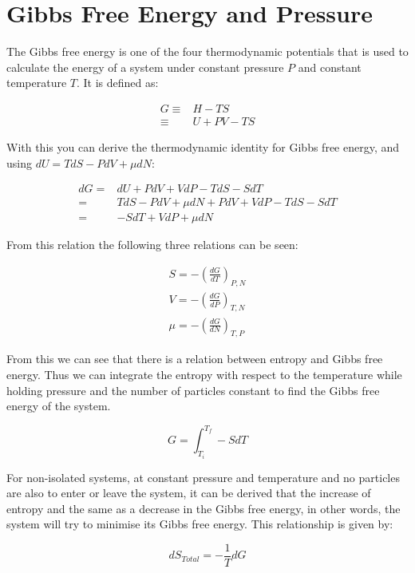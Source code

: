 \documentclass[../hand-in3.tex]{subfiles}
\begin{document}
\section{Gibbs Free Energy and Pressure}

The Gibbs free energy is one of the four thermodynamic potentials that is used to calculate the energy of a system under constant pressure $P$ and constant temperature $T$. It is defined as:

\begin{align}
G \equiv& H - TS \\
  \equiv& U +PV -TS 	
\end{align}

With this you can derive the thermodynamic identity for Gibbs free energy, and using $dU = TdS - PdV + \mu dN$:

\begin{align}
dG =& dU + PdV + VdP -TdS -SdT \\
   =& TdS - PdV + \mu dN + PdV + VdP -TdS -SdT \\ 
   =& -SdT + VdP + \mu dN
\end{align}

From this relation the following three relations can be seen:

\begin{align}
S = - \left( \frac{dG}{dT} \right)_{P,N} \\
V = - \left( \frac{dG}{dP} \right)_{T,N} \\
\mu = - \left( \frac{dG}{dN} \right)_{T,P} 
\end{align}

From this we can see that there is a relation between entropy and Gibbs free energy. Thus we can integrate the entropy with respect to the temperature while holding pressure and the number of particles constant to find the Gibbs free energy of the system.

\begin{equation}
G = \int_{T_i}^{T_f} -SdT
\end{equation}

For non-isolated systems, at constant pressure and temperature and no particles are also to enter or leave the system, it can be derived that the increase of entropy and the same as a decrease in the Gibbs free energy, in other words, the system will try to minimise its Gibbs free energy. This relationship is given by:

\begin{equation}
dS_{Total} = - \frac{1}{T} dG
\end{equation}
\end{document}
